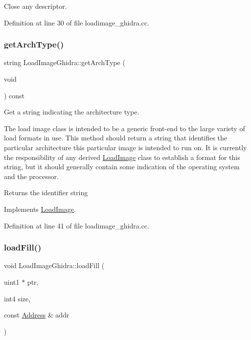 Close any descriptor. 



Definition at line 30 of file loadimage\+\_\+ghidra.\+cc.

\mbox{\label{class_load_image_ghidra_aa7df1ff6995b047b625f104053f71e47}} 
\subsubsection{\texorpdfstring{getArchType()}{getArchType()}}
{\footnotesize\ttfamily string Load\+Image\+Ghidra\+::get\+Arch\+Type (\begin{DoxyParamCaption}\item[{void}]{ }\end{DoxyParamCaption}) const\hspace{0.3cm}{\ttfamily [virtual]}}



Get a string indicating the architecture type. 

The load image class is intended to be a generic front-\/end to the large variety of load formats in use. This method should return a string that identifies the particular architecture this particular image is intended to run on. It is currently the responsibility of any derived \mbox{\hyperlink{class_load_image}{Load\+Image}} class to establish a format for this string, but it should generally contain some indication of the operating system and the processor. \begin{DoxyReturn}{Returns}
the identifier string 
\end{DoxyReturn}


Implements \mbox{\hyperlink{class_load_image_a5103418147e95994f66e77746c0a0cfc}{Load\+Image}}.



Definition at line 41 of file loadimage\+\_\+ghidra.\+cc.

\mbox{\label{class_load_image_ghidra_accc4b273390b6959e4552490fbb146c7}} 
\subsubsection{\texorpdfstring{loadFill()}{loadFill()}}
{\footnotesize\ttfamily void Load\+Image\+Ghidra\+::load\+Fill (\begin{DoxyParamCaption}\item[{uint1 $\ast$}]{ptr,  }\item[{int4}]{size,  }\item[{const \mbox{\hyperlink{class_address}{Address}} \&}]{addr }\end{DoxyParamCaption})\hspace{0.3cm}{\ttfamily [virtual]}}



